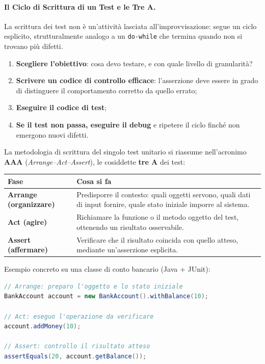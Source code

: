 \documentclass[12pt]{extarticle}
\begin{document}
\paragraph{Il Ciclo di Scrittura di un Test e le Tre A.}
La scrittura dei test non è un'attività lasciata all'improvvisazione: segue un ciclo esplicito, strutturalmente analogo a un \texttt{do-while} che termina quando non si trovano più difetti.
\begin{enumerate}
    \item \textbf{Scegliere l'obiettivo}: cosa devo testare, e con quale livello di granularità?
    \item \textbf{Scrivere un codice di controllo efficace}: l'asserzione deve essere in grado di distinguere il comportamento corretto da quello errato;
    \item \textbf{Eseguire il codice di test};
    \item \textbf{Se il test non passa, eseguire il debug} e ripetere il ciclo finché non emergono nuovi difetti.
\end{enumerate}

\noindent La metodologia di scrittura del singolo test unitario si riassume nell'acronimo \textbf{AAA} (\textit{Arrange--Act--Assert}), le cosiddette \textbf{tre A} dei test:
\begin{center}
\small
\begin{tabular}{p{3.4cm}p{11.2cm}}
    \toprule
    \textbf{Fase} & \textbf{Cosa si fa} \\
    \midrule
    \textbf{Arrange (organizzare)} & Predisporre il contesto: quali oggetti servono, quali dati di input fornire, quale stato iniziale imporre al sistema. \\
    \addlinespace
    \textbf{Act (agire)} & Richiamare la funzione o il metodo oggetto del test, ottenendo un risultato osservabile. \\
    \addlinespace
    \textbf{Assert (affermare)} & Verificare che il risultato coincida con quello atteso, mediante un'asserzione esplicita. \\
    \bottomrule
\end{tabular}
\end{center}

\noindent Esempio concreto su una classe di conto bancario (Java + JUnit):
\begin{lstlisting}[language=Java]
// Arrange: preparo l'oggetto e lo stato iniziale
BankAccount account = new BankAccount().withBalance(10);

// Act: eseguo l'operazione da verificare
account.addMoney(10);

// Assert: controllo il risultato atteso
assertEquals(20, account.getBalance());
\end{lstlisting}
\end{document}

